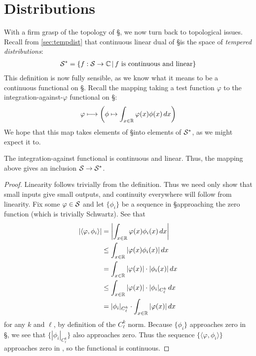 
  \chapter{Distributions}
  \label{ch:dist}
  
  With a firm grasp of the topology of \S, we now turn back to topological issues.
  Recall from \cref{sec:tempdist} that continuous linear dual of \S is the space of \emph{tempered distributions}:
  \begin{align*}
    \S^* = \{f:\S\rightarrow\C\,\vert\,f\text{ is continuous and linear}\}
  \end{align*}
  This definition is now fully sensible, as we know what it means to be a continuous functional on \S.
  Recall the mapping taking a test function $\varphi$ to the integration-against-$\varphi$ functional on \S:
  \begin{align*}
    \varphi \longmapsto \left( \phi \mapsto \int_{x\in\R} \varphi(x) \phi(x)\,dx \right)
  \end{align*}
  We hope that this map takes elements of \S into elements of $\S^*$, as we might expect it to.
  \begin{thm}
    The integration-against functional is continuous and linear.
    Thus, the mapping above gives an inclusion $\S\rightarrow\S^*$.
  \end{thm}
  \begin{proof}
    Linearity follows trivially from the definition.
    Thus we need only show that small inputs give small outputs, and continuity everywhere will follow from linearity.
    Fix some $\varphi\in\S$ and let $\{\phi_i\}$ be a sequence in \S approaching the zero function (which is trivially Schwartz).
    See that
    \begin{align*}
      |\langle\varphi,\phi_i\rangle| 
      &= \left|\int_{x\in\R} \varphi(x)\phi_i(x)\,dx\right|
      \\&\le \int_{x\in\R}| \varphi(x)\phi_i(x)|\,dx
      \\&= \int_{x\in\R}|\varphi(x)|\cdot|\phi_i(x)|\,dx
      \\&\le \int_{x\in\R}|\varphi(x)|\cdot|\phi_i|_{C^k_\ell}\,dx
      \\&= |\phi_i|_{C^k_\ell}\cdot\int_{x\in\R}|\varphi(x)|\,dx
    \end{align*}
    for any $k$ and $\ell$, by definition of the $C^k_\ell$ norm.
    Because $\{\phi_i\}$ approaches zero in \S, we see that $\{|\phi_i|_{C^k_\ell}\}$ also approaches zero.
    Thus the sequence $\{\langle\varphi,\phi_i\rangle\}$ approaches zero in \C, so the functional is continuous.
  \end{proof}

